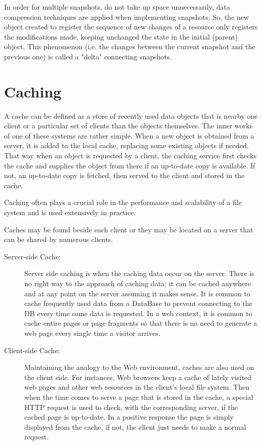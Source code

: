 In order for multiple snapshots, do not take up space unnecessarily, data compression techniques are applied when implementing snapshots. So, the new object created to register the sequence of new changes of a resource only registers the modifications made, keeping unchanged the state in the initial (parent) object. This phenomenon (i.e. the changes between the current snapshot and the previous one) is called a "delta" connecting snapshots.



\section{Caching} %
\label{sec:caching}


A cache can be defined as a store of recently used data objects that is nearby one client or a particular set of clients than the objects themselves. The inner works of one of these systems are rather simple. When a new object is obtained from a server, it is added to the local cache, replacing some existing objects if needed. That way when an object is requested by a client, the caching service first checks the cache and supplies the object from there if an up-to-date copy is available. If not, an up-to-date copy is fetched, then served to the client and stored in the cache. 

Caching often plays a crucial role in the performance and scalability of a file system and is used extensively in practice.

Caches may be found beside each client or they may be located on a server that can be shared by numerous clients.

\begin{description}
	\item [Server-side Cache:] Server side caching is when the caching data occur on the server. There is no right way to the approach of caching data; it can be cached anywhere and at any point on the server assuming it makes sense. It is common to cache frequently used data from a DataBase to prevent connecting to the DB every time some data is requested. In a web context, it is common to cache entire pages or page fragments so that there is no need to generate a web page every single time a visitor arrives.
	\item [Client-side Cache:] Maintaining the analogy to the Web environment, caches are also used on the client side. For instances, Web browsers keep a cache of lately visited web pages and other web resources in the client’s local file system. Then when the time comes to serve a page that is stored in the cache, a special HTTP request is used to check, with the corresponding server, if the cached page is up-to-date. In a positive response the page is simply displayed from the cache, if not, the client just needs to make a normal request.
\end{description}



